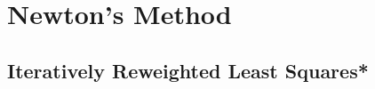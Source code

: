\chapter{Newton's Method}
\label{chap:newton}

\section{}

\section{}

\section{}

\section{}

\section{Iteratively Reweighted Least Squares*}
\label{sec:irls}






